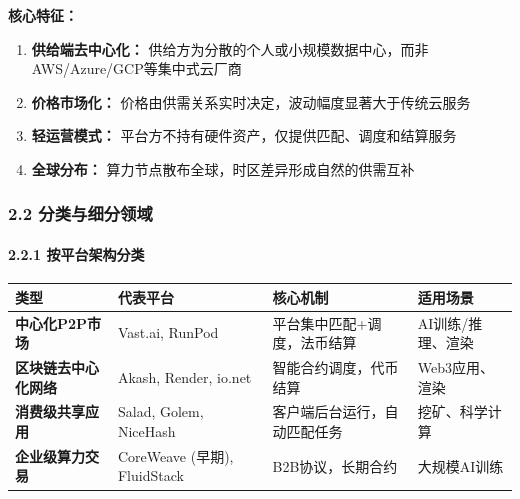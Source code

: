 \documentclass[UTF8,a4paper,12pt]{ctexart}
\begin{document}
\textbf{核心特征：}

\begin{enumerate}
\def\labelenumi{\arabic{enumi}.}
\tightlist
\item
  \textbf{供给端去中心化：}
  供给方为分散的个人或小规模数据中心，而非AWS/Azure/GCP等集中式云厂商
\item
  \textbf{价格市场化：}
  价格由供需关系实时决定，波动幅度显著大于传统云服务
\item
  \textbf{轻运营模式：} 平台方不持有硬件资产，仅提供匹配、调度和结算服务
\item
  \textbf{全球分布：} 算力节点散布全球，时区差异形成自然的供需互补
\end{enumerate}

\subsubsection{2.2
分类与细分领域}\label{ux5206ux7c7bux4e0eux7ec6ux5206ux9886ux57df}

\paragraph{2.2.1
按平台架构分类}\label{ux6309ux5e73ux53f0ux67b6ux6784ux5206ux7c7b}

{\def\LTcaptype{none} %
\begin{longtable}[]{@{}
  >{\raggedright\arraybackslash}p{}
  >{\raggedright\arraybackslash}p{}
  >{\raggedright\arraybackslash}p{}
  >{\raggedright\arraybackslash}p{}@{}}
\toprule\noalign{}
\begin{minipage}[b]{\linewidth}\raggedright
类型
\end{minipage} & \begin{minipage}[b]{\linewidth}\raggedright
代表平台
\end{minipage} & \begin{minipage}[b]{\linewidth}\raggedright
核心机制
\end{minipage} & \begin{minipage}[b]{\linewidth}\raggedright
适用场景
\end{minipage} \\
\midrule\noalign{}
\endhead
\bottomrule\noalign{}
\endlastfoot
\textbf{中心化P2P市场} & Vast.ai, RunPod & 平台集中匹配+调度，法币结算 &
AI训练/推理、渲染 \\
\textbf{区块链去中心化网络} & Akash, Render, io.net &
智能合约调度，代币结算 & Web3应用、渲染 \\
\textbf{消费级共享应用} & Salad, Golem, NiceHash &
客户端后台运行，自动匹配任务 & 挖矿、科学计算 \\
\textbf{企业级算力交易} & CoreWeave (早期), FluidStack &
B2B协议，长期合约 & 大规模AI训练 \\
\end{longtable}
}
\end{document}
